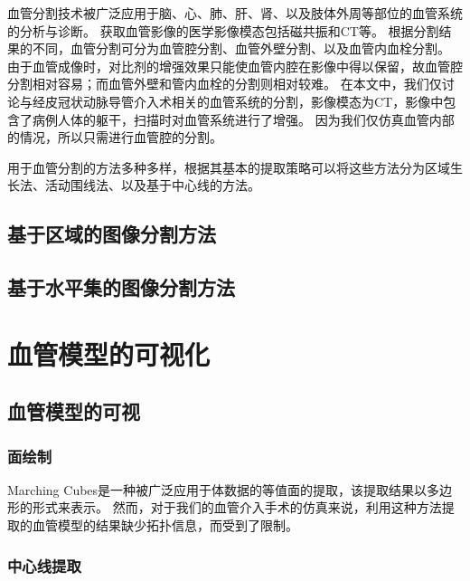 血管分割技术被广泛应用于脑、心、肺、肝、肾、以及肢体外周等部位的血管系统的分析与诊断。
获取血管影像的医学影像模态包括磁共振和CT等。
根据分割结果的不同，血管分割可分为血管腔分割、血管外壁分割、以及血管内血栓分割\cite{Lesage2009Review}。
由于血管成像时，对比剂的增强效果只能使血管内腔在影像中得以保留，故血管腔分割相对容易；而血管外壁和管内血栓的分割则相对较难。
在本文中，我们仅讨论与经皮冠状动脉导管介入术相关的血管系统的分割，影像模态为CT，影像中包含了病例人体的躯干，扫描时对血管系统进行了增强。
因为我们仅仿真血管内部的情况，所以只需进行血管腔的分割。

用于血管分割的方法多种多样，根据其基本的提取策略可以将这些方法分为区域生长法、活动围线法、以及基于中心线的方法。

\subsection{基于区域的图像分割方法}

\subsection{基于水平集的图像分割方法}

\cite{Sethian1996FastMarching} \cite{Osher1988LevelSet}


\section{血管模型的可视化}

\subsection{血管模型的可视}

\subsubsection{面绘制}

Marching Cubes\cite{Lorensen1987MC}是一种被广泛应用于体数据的等值面的提取，该提取结果以多边形的形式来表示。
然而，对于我们的血管介入手术的仿真来说，利用这种方法提取的血管模型的结果缺少拓扑信息，而受到了限制\cite{Nowinski2001NeuroCath}\cite{Hahn1998GWU}。

\subsubsection{中心线提取}


